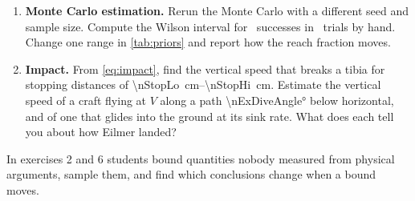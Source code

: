 \begin{enumerate}
  \item \textbf{Monte Carlo estimation.}
  Rerun the Monte Carlo with a different seed and sample size.
  Compute the Wilson interval for \nReachSlopeN\ successes in \nSamples\ trials by hand.
  Change one range in \cref{tab:priors} and report how the reach fraction moves.

  \item \textbf{Impact.}
  From \cref{eq:impact}, find the vertical speed that breaks a tibia for stopping distances of
  \SIrange{\nStopLo}{\nStopHi}{\centi\meter}.
  Estimate the vertical speed of a craft flying at \(V\) along a path \ang{\nExDiveAngle} below horizontal,
  and of one that glides into the ground at its sink rate.
  What does each tell you about how Eilmer landed?
\end{enumerate}

In exercises 2 and 6 students bound quantities nobody measured from physical arguments,
sample them, and find which conclusions change when a bound moves.
